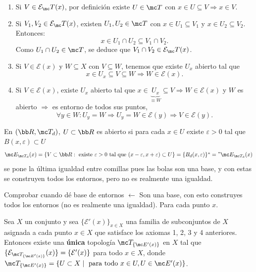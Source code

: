 \begin{dem}
\begin{enumerate}
    \item Si \(V \in \mathcal{E}_\mc T(x)\), por definición existe \(U \in \mc T\) con \(x \in U \subseteq V \Rightarrow x \in V\).
    \item Si \(V_1, V_2 \in \mathcal{E}_\mc T(x)\), existen \(U_1, U_2 \in \mc T\) con \(x \in U_1 \subseteq V_1\) y \(x \in U_2 \subseteq V_2\). Entonces:
    \[
        x \in U_1 \cap U_2 \subseteq V_1 \cap V_2 \text{}.
    \]
    Como \(U_1 \cap U_2 \in \mc T\), se deduce que \(V_1 \cap V_2 \in \mathcal{E}_\mc T(x)\).
     \item Si \(V \in \mathcal{E}(x)\) y \(W \subseteq X\) con \(V \subseteq W\), tenemos que existe \(U_x\) abierto tal que
    \[
        x \in U_x \subseteq V \subseteq W \Rightarrow W \in \mathcal{E}(x).
    \]
        \item Si \(V \in \mathcal{E}(x)\), existe \(U_x\) abierto tal que \(x \in \underbrace{U_x}_{\equiv W} \subseteq V \Rightarrow W \in \mathcal{E}(x)\) y \(W\) es abierto \(\Rightarrow\) es entorno de todos sus puntos,
    \[
        \forall y \in W : U_y = W \Rightarrow U_y = W \in \mathcal{E}(y) \Rightarrow V \in \mathcal{E}(y). \tag*{\(\blacksquare\)}
    \]
\end{enumerate}
\end{dem}
\begin{ejem}
    En $(\bb R, \mc T_d)$, $U \subset \bb R$ es abierto si para cada $x\in U$ existe $\varepsilon>0$ tal que $B(x,\varepsilon) \subset U$
    $$\mc E_{\mc T_d}(x) = \{V\subset \bb R : \text{ existe } \varepsilon>0 \text{ tal que } (x-\varepsilon, x+\varepsilon)\subset U\} = \{B_d(x, \varepsilon)\}``="\mc E_{\mc T_d}(x)$$
    se pone la \'ultima igualdad entre comillas pues las bolas son una base, y con estas se construyen todos los entornos, pero no es realmente una igualdad. 
\end{ejem}
\begin{obs}
        Comprobar cuando dé base de entornos \(\leftarrow\) Son una base, con esto construyes todos los entornos (no es realmente una igualdad). Para cada punto \(x\).
    \end{obs}
\begin{teo}
Sea \(X\) un conjunto y sea \(\{\mathcal{E}'(x)\}_{x \in X}\) una familia de subconjuntos de \(X\) asignada a cada punto \(x \in X\) que satisface los axiomas 1, 2, 3 y 4 anteriores. Entonces existe una \textbf{única} topología \(\mc T_{\{\mc E'(x)\}}\) en \(X\) tal que \(\{\mathcal{E}_{\mc T_{\{\mc E'(x)\}}}(x) \}= \{\mathcal{E}'(x)\}\) para todo \(x \in X\), donde $\mc T_{\{\mc E'(x)\}}=\{U\subset X \mid \text{ para todo } x\in U, U\in \mc E'(x)\}$.
\end{teo}

